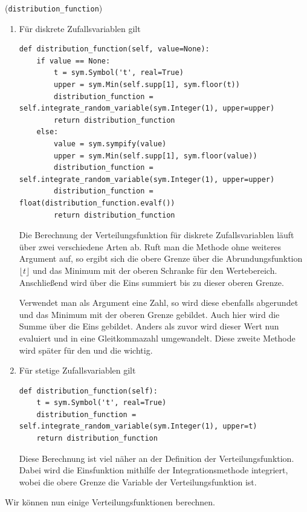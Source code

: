 \begin{Code}{(\lstinline|distribution_function|)}
\begin{enumerate}[label=(\roman*)]
\item Für diskrete Zufallsvariablen gilt
\begin{lstlisting}
def distribution_function(self, value=None):
    if value == None:
        t = sym.Symbol('t', real=True)
        upper = sym.Min(self.supp[1], sym.floor(t))
        distribution_function = self.integrate_random_variable(sym.Integer(1), upper=upper)
        return distribution_function
    else:
        value = sym.sympify(value)
        upper = sym.Min(self.supp[1], sym.floor(value))
        distribution_function = self.integrate_random_variable(sym.Integer(1), upper=upper)
        distribution_function = float(distribution_function.evalf())
        return distribution_function
\end{lstlisting}
Die Berechnung der Verteilungsfunktion für diskrete Zufallsvariablen läuft über zwei verschiedene Arten ab. Ruft man die Methode ohne weiteres Argument auf, so ergibt sich die obere Grenze über die Abrundungsfunktion $\lfloor t \rfloor$ und das Minimum mit der oberen Schranke für den Wertebereich. Anschließend wird über die Eins summiert bis zu dieser oberen Grenze.

\newpage

Verwendet man als Argument eine Zahl, so wird diese ebenfalls abgerundet und das Minimum mit der oberen Grenze gebildet. Auch hier wird die Summe über die Eins gebildet. Anders als zuvor wird dieser Wert nun evaluiert und in eine Gleitkommazahl umgewandelt. Diese zweite Methode wird später für den \hyperlink{Code:PlotDistr}{} und die \hyperlink{Sec:Sim}{} wichtig.

\item Für stetige Zufallsvariablen gilt
\begin{lstlisting}
def distribution_function(self):
    t = sym.Symbol('t', real=True)
    distribution_function = self.integrate_random_variable(sym.Integer(1), upper=t)
    return distribution_function
\end{lstlisting}
Diese Berechnung ist viel näher an der Definition der Verteilungsfunktion. Dabei wird die Einsfunktion mithilfe der Integrationsmethode integriert, wobei die obere Grenze die Variable der Verteilungsfunktion ist.
\end{enumerate}
\end{Code}

\vspace*{-\medskipamount}

Wir können nun einige Verteilungsfunktionen berechnen.

